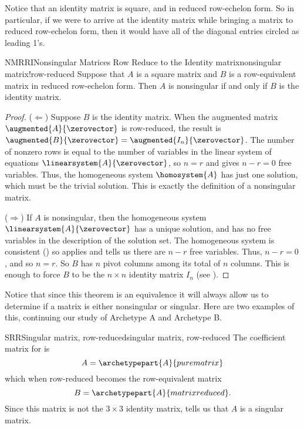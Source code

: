%
Notice that an identity matrix is square, and in reduced row-echelon form.  So in particular, if we were to arrive at the identity matrix while bringing a matrix to reduced row-echelon form, then it would have all of the diagonal entries circled as leading 1's.
%
\begin{theorem}{NMRRI}{Nonsingular Matrices Row Reduce to the Identity matrix}{nonsingular matrix!row-reduced}
Suppose that $A$ is a square matrix and $B$ is a row-equivalent matrix in reduced row-echelon form.  Then $A$ is nonsingular if and only if $B$ is the identity matrix. 
\end{theorem}
%
\begin{proof}
($\Leftarrow$)  Suppose $B$ is the identity matrix.  When the augmented matrix $\augmented{A}{\zerovector}$ is row-reduced, the result is $\augmented{B}{\zerovector}=\augmented{I_n}{\zerovector}$.  The number of nonzero rows is equal to the number of variables in the linear system of equations $\linearsystem{A}{\zerovector}$, so $n=r$ and  gives $n-r=0$ free variables.  Thus, the homogeneous system $\homosystem{A}$ has just one solution, which must be the trivial solution.  This is exactly the definition of a nonsingular matrix.\par
%
($\Rightarrow$)  If $A$ is nonsingular, then the homogeneous system $\linearsystem{A}{\zerovector}$ has a unique solution, and has no free variables in the description of the solution set.  The homogeneous system is consistent () so   applies and tells us there are $n-r$ free variables.  Thus, $n-r=0$, and so $n=r$.  So $B$ has $n$ pivot columns among its total of $n$ columns.  This is enough to force $B$ to be the $n\times n$ identity matrix $I_n$ (see ).
\end{proof}
%
Notice that since this theorem is an equivalence it will always allow us to determine if a matrix is either nonsingular or singular.  Here are two examples of this, continuing our study of Archetype A and Archetype B.
%
\begin{example}{SRR}{Singular matrix, row-reduced}{singular matrix, row-reduced}
The coefficient matrix for  is
%
\begin{equation*}
A=\archetypepart{A}{purematrix}
\end{equation*}
%
which when row-reduced becomes the row-equivalent matrix
%
\begin{equation*}
B=\archetypepart{A}{matrixreduced}.
\end{equation*}
%
Since this matrix is not the $3\times 3$ identity matrix,  tells us that $A$ is a singular matrix.
\end{example}
